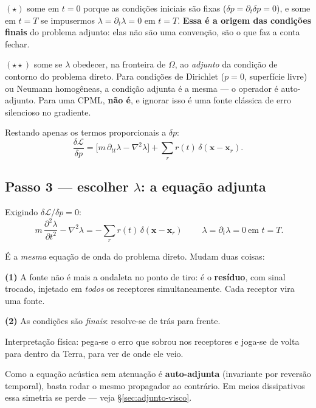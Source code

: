 \documentclass[11pt,a4paper,oneside]{report}
\begin{document}
\begin{atencao}
$(\star)$ some em $t=0$ porque as condi\c{c}\~oes iniciais s\~ao fixas
($\delta p = \partial_t\delta p = 0$), e some em $t=T$ se impusermos
$\lambda = \partial_t\lambda = 0$ em $t = T$. \textbf{Essa \'e a origem das
condi\c{c}\~oes finais} do problema adjunto: elas n\~ao s\~ao uma
conven\c{c}\~ao, s\~ao o que faz a conta fechar.

$(\star\star)$ some se $\lambda$ obedecer, na fronteira de $\Omega$, ao
\emph{adjunto} da condi\c{c}\~ao de contorno do problema direto. Para
condi\c{c}\~oes de Dirichlet ($p=0$, superf\'icie livre) ou Neumann
homog\^eneas, a condi\c{c}\~ao adjunta \'e a mesma --- o operador \'e
auto-adjunto. Para uma CPML, \textbf{n\~ao \'e}, e ignorar isso \'e uma fonte
cl\'assica de erro silencioso no gradiente.
\end{atencao}

Restando apenas os termos proporcionais a $\delta p$:
\begin{equation}
\frac{\delta\mathcal{L}}{\delta p}
 = \bigl[m\,\partial_{tt}\lambda - \nabla^{2}\lambda\bigr]
 + \sum_{r} r(t)\,\delta(\mathbf{x}-\mathbf{x}_r).
\end{equation}

\subsection*{Passo 3 --- escolher $\lambda$: a equa\c{c}\~ao adjunta}

Exigindo $\delta\mathcal{L}/\delta p = 0$:
\begin{equation}
\boxed{\;
m\,\frac{\partial^{2}\lambda}{\partial t^{2}} - \nabla^{2}\lambda
 = -\sum_{r} r(t)\,\delta(\mathbf{x}-\mathbf{x}_r)\;}
\qquad
\lambda = \partial_t\lambda = 0 \ \text{em } t = T .
\label{eq:adjunta}
\end{equation}

\begin{teoria}
\'E a \emph{mesma} equa\c{c}\~ao de onda do problema direto. Mudam duas
coisas:

\textbf{(1)} A fonte n\~ao \'e mais a ondaleta no ponto de tiro: \'e o
\textbf{res\'iduo}, com sinal trocado, injetado em \emph{todos} os receptores
simultaneamente. Cada receptor vira uma fonte.

\textbf{(2)} As condi\c{c}\~oes s\~ao \emph{finais}: resolve-se de tr\'as para
frente.

Interpreta\c{c}\~ao f\'isica: pega-se o erro que sobrou nos receptores e
joga-se de volta para dentro da Terra, para ver de onde ele veio.

Como a equa\c{c}\~ao ac\'ustica sem atenua\c{c}\~ao \'e \textbf{auto-adjunta}
(invariante por revers\~ao temporal), basta rodar o mesmo propagador ao
contr\'ario. Em meios dissipativos essa simetria se perde --- veja
§\ref{sec:adjunto-visco}.
\end{teoria}
\end{document}
